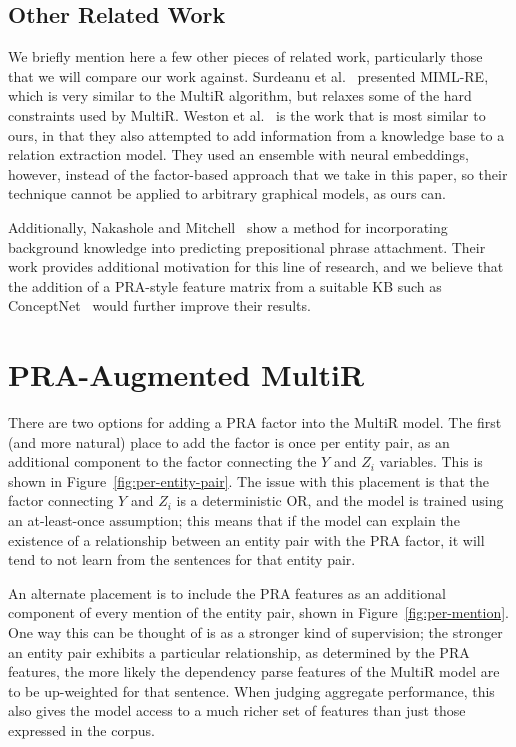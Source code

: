 \documentclass[11pt,a4paper]{article}
\newcommand{\figref}[1]{Figure~\ref{fig:#1}}
\begin{document}
\subsection{Other Related Work}
\label{sec:related-work}

We briefly mention here a few other pieces of related work, particularly those
that we will compare our work against.  Surdeanu et
al.~ presented MIML-RE, which is
very similar to the MultiR algorithm, but relaxes some of the hard constraints
used by MultiR.  Weston et
al.~ is the work that is most
similar to ours, in that they also attempted to add information from a
knowledge base to a relation extraction model.  They used an ensemble with
neural embeddings, however, instead of the factor-based approach that we take
in this paper, so their technique cannot be applied to arbitrary graphical
models, as ours can.

Additionally, Nakashole and Mitchell~
show a method for incorporating background knowledge into predicting
prepositional phrase attachment.  Their work provides additional motivation
for this line of research, and we believe that the addition of a PRA-style
feature matrix from a suitable KB such as ConceptNet~\cite{conceptnet-2004}
would further improve their results.

\section{PRA-Augmented MultiR}
\label{sec:pra-augmented-multir}

There are two options for adding a PRA factor into the MultiR model.  The first
(and more natural) place to add the factor is once per entity pair, as an
additional component to the factor connecting the $Y$ and $Z_i$ variables.
This is shown in \figref{per-entity-pair}.  The issue with this placement is
that the factor connecting $Y$ and $Z_i$ is a deterministic OR, and the model
is trained using an at-least-once assumption; this means that if the model can
explain the existence of a relationship between an entity pair with the PRA
factor, it will tend to not learn from the sentences for that entity pair.

An alternate placement is to include the PRA features as an additional
component of every mention of the entity pair, shown in \figref{per-mention}.
One way this can be thought of is as a stronger kind of supervision; the
stronger an entity pair exhibits a particular relationship, as determined by
the PRA features, the more likely the dependency parse features of the MultiR
model are to be up-weighted for that sentence.  When judging aggregate
performance, this also gives the model access to a much richer set of features
than just those expressed in the corpus.
\end{document}
